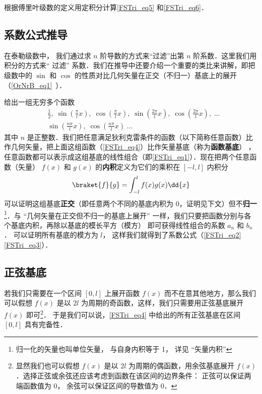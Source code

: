 \begin{exercise}{}
根据傅里叶级数的定义用定积分计算\autoref{FSTri_eq5} 和\autoref{FSTri_eq6}．
\end{exercise}

\subsection{系数公式推导}

在泰勒级数中，%
我们通过求 $n$ 阶导数的方式来“过滤”出第 $n$ 阶系数．这里我们用积分的方式来“ 过滤” 系数．我们在推导中还要介绍一个重要的类比来讲解，即把级数中的 $\sin$ 和 $\cos$ 的性质对比几何矢量在正交（不归一）基底上的展开（\autoref{OrNrB_eq1}~）．

% 

给出一组无穷多个函数
\begin{equation}\label{FSTri_eq4}
\begin{aligned}
&\frac12,\;   \sin(\frac{\pi}{l} x),\;   \cos(\frac{\pi}{l} x),\;   \sin(\frac{2\pi}{l} x),\;   \cos(\frac{2\pi}{l} x),\;   \dots\\
&\sin(\frac{n\pi}{l} x),\;   \cos(\frac{n\pi}{l} x)\;   \dots
\end{aligned}\end{equation}
其中 $n$ 是正整数．我们把任意满足狄利克雷条件的函数（以下简称任意函数）比作几何矢量，把上面这组函数（\autoref{FSTri_eq4}）比作矢量基底（称为\textbf{函数基底}）
，任意函数都可以表示成这组基底的线性组合（即\autoref{FSTri_eq1}）．现在把两个任意函数（矢量） $f(x)$ 和 $g(x)$ 的\textbf{内积}定义为它们的乘积在 $[-l,l]$ 内积分
\begin{equation}
\braket{f}{g} = \int_{-l}^{l} f(x) g(x) \dd{x}
\end{equation}
可以证明这组基底\textbf{正交}（即任意两个不同的基底内积为 0，证明见下文）但不\textbf{归一}\footnote{归一化的矢量也叫单位矢量， 与自身内积等于 1， 详见 “矢量内积”}．与 “几何矢量在正交但不归一的基底上展开” 一样，我们只要把函数分别与各个基底内积，再除以基底的模长平方（模方）
即可获得线性组合的系数 $a_n$ 和 $b_n$． 可以证明所有基底的模方为 $l$， 这样我们就得到了系数公式（\autoref{FSTri_eq2} \autoref{FSTri_eq3}）．


\subsection{正弦基底}
若我们只需要在一个区间 $[0,l]$ 上展开函数 $f(x)$ 而不在意其他地方，那么我们可以假想 $f(x)$ 是以 $2l$ 为周期的奇函数，这样，我们只需要用正弦基底展开 $f(x)$ 即可\footnote{显然我们也可以假想 $f(x)$ 是以 $2l$ 为周期的偶函数，用余弦基底展开 $f(x)$．选择正弦或余弦还应该考虑到函数在该区间的边界条件： 正弦可以保证两端函数值为 0， 余弦可以保证区间的导数值为 0．}． 于是我们可以说，\autoref{FSTri_eq4} 中给出的所有正弦基底在区间 $[0,l]$ 具有完备性．

